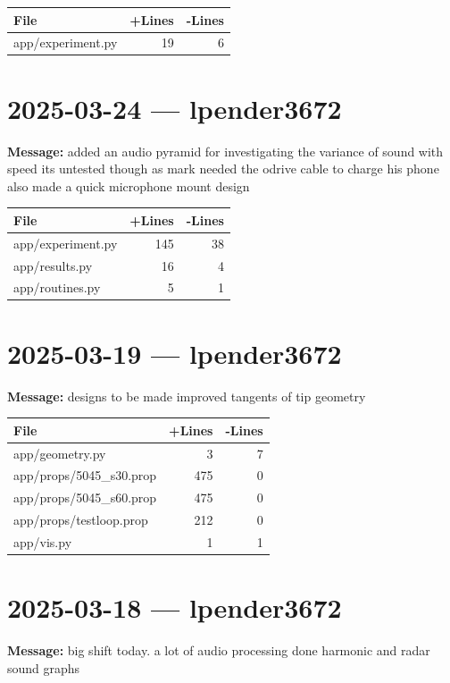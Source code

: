 \documentclass{article}
\begin{document}
\begin{longtable}{|p{10cm}|r|r|}
\hline \textbf{File} & \textbf{+Lines} & \textbf{-Lines} \\
\hline
app/experiment.py & 19 & 6 \\
\hline
\end{longtable}

\section*{2025-03-24 --- lpender3672}
\textbf{Message:} added an audio pyramid for investigating the variance of sound with speed its untested though as mark needed the odrive cable to charge his phone also made a quick microphone mount design

\begin{longtable}{|p{10cm}|r|r|}
\hline \textbf{File} & \textbf{+Lines} & \textbf{-Lines} \\
\hline
app/experiment.py & 145 & 38 \\
\hline
app/results.py & 16 & 4 \\
\hline
app/routines.py & 5 & 1 \\
\hline
\end{longtable}

\section*{2025-03-19 --- lpender3672}
\textbf{Message:} designs to be made improved tangents of tip geometry

\begin{longtable}{|p{10cm}|r|r|}
\hline \textbf{File} & \textbf{+Lines} & \textbf{-Lines} \\
\hline
app/geometry.py & 3 & 7 \\
\hline
app/props/5045\_s30.prop & 475 & 0 \\
\hline
app/props/5045\_s60.prop & 475 & 0 \\
\hline
app/props/testloop.prop & 212 & 0 \\
\hline
app/vis.py & 1 & 1 \\
\hline
\end{longtable}

\section*{2025-03-18 --- lpender3672}
\textbf{Message:} big shift today. a lot of audio processing done harmonic and radar sound graphs
\end{document}
